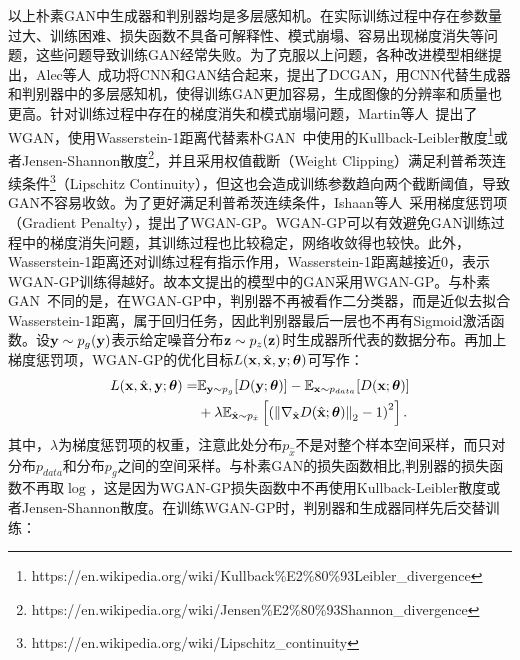 \noindent 以上朴素GAN中生成器和判别器均是多层感知机。在实际训练过程中存在参数量过大、训练困难、损失函数不具备可解释性、模式崩塌、容易出现梯度消失等问题，这些问题导致训练GAN经常失败。为了克服以上问题，各种改进模型相继提出，Alec等人~\cite{radford2015unsupervised}成功将CNN和GAN结合起来，提出了DCGAN，用CNN代替生成器和判别器中的多层感知机，使得训练GAN更加容易，生成图像的分辨率和质量也更高。针对训练过程中存在的梯度消失和模式崩塌问题，Martin等人~\cite{arjovsky2017wasserstein}提出了WGAN，使用Wasserstein-1距离代替素朴GAN~\cite{goodfellow2014generative}中使用的Kullback-Leibler散度\footnote{https://en.wikipedia.org/wiki/Kullback\%E2\%80\%93Leibler\_divergence}或者Jensen-Shannon散度\footnote{https://en.wikipedia.org/wiki/Jensen\%E2\%80\%93Shannon\_divergence}，并且采用权值截断（Weight Clipping）满足利普希茨连续条件\footnote{https://en.wikipedia.org/wiki/Lipschitz\_continuity}（Lipschitz Continuity），但这也会造成训练参数趋向两个截断阈值，导致GAN不容易收敛。为了更好满足利普希茨连续条件，Ishaan等人~\cite{gulrajani2017improved}采用梯度惩罚项（Gradient Penalty），提出了WGAN-GP。WGAN-GP可以有效避免GAN训练过程中的梯度消失问题，其训练过程也比较稳定，网络收敛得也较快。此外，Wasserstein-1距离还对训练过程有指示作用，Wasserstein-1距离越接近0，表示WGAN-GP训练得越好。故本文提出的模型中的GAN采用WGAN-GP。与朴素GAN~\cite{goodfellow2014generative}不同的是，在WGAN-GP中，判别器不再被看作二分类器，而是近似去拟合Wasserstein-1距离，属于回归任务，因此判别器最后一层也不再有Sigmoid激活函数。设$\mathbf{y}\sim {p}_{g}(\mathbf{y})$表示给定噪音分布$\mathbf{z}\sim {p}_{{z}}(\mathbf{z})$时生成器所代表的数据分布。再加上梯度惩罚项，WGAN-GP的优化目标$L(\mathbf{x},\hat{\mathbf{x}},\mathbf{y};\mbox{\boldmath $\theta$})$可写作：
\begin{equation}\label{wgan_gp_loss_func}
  \begin{aligned}
	L(\mathbf{x},\hat{\mathbf{x}},\mathbf{y};\mbox{\boldmath $\theta$})=&\mathbb{E}_{\mathbf{y} \sim {p}_{{g}}}[D(\mathbf{y};\mbox{\boldmath $\theta$})]-\mathbb{E}_{\mathbf{x} \sim {p}_{{data}}}[D(\mathbf{x};\mbox{\boldmath $\theta$})] \\ &+\lambda \mathbb{E}_{\hat{\mathbf{x}} \sim {p}_{\hat{{x}}}}\left[\left(\left\|\nabla_{\hat{\mathbf{x}}}D(\hat{\mathbf{x}};\mbox{\boldmath $\theta$})\right\|_{2}-1\right)^{2}\right].
  \end{aligned}
\end{equation}
其中，$\lambda$为梯度惩罚项的权重，注意此处分布${p}_{\hat{{x}}}$不是对整个样本空间采样，而只对分布${p}_{{data}}$和分布${p}_{{g}}$之间的空间采样。与朴素GAN的损失函数相比,判别器的损失函数不再取$\log$，这是因为WGAN-GP损失函数中不再使用Kullback-Leibler散度或者Jensen-Shannon散度。在训练WGAN-GP时，判别器和生成器同样先后交替训练：

